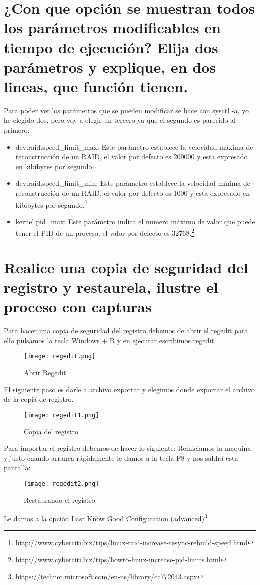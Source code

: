\section{¿Con que opción se muestran todos los parámetros modificables en tiempo de ejecución? Elija dos parámetros y explique, en dos lineas, que función tienen.}
Para poder ver los parámetros que se pueden modificar se hace con sysctl -a, yo he elegido dos, pero voy a elegir un tercero ya que el segundo es parecido al primero.
\begin{itemize}
\item dev.raid.speed\_limit\_max: Este parámetro establece la velocidad máxima de reconstrucción de un RAID, el valor por defecto es 200000 y esta expresado en kibibytes por segundo.
\item dev.raid.speed\_limit\_min: Este parámetro establece la velocidad mínima de reconstrucción de un RAID, el valor por defecto es 1000 y esta expresado en kibibytes por segundo.\footnote{\url{http://www.cyberciti.biz/tips/linux-raid-increase-resync-rebuild-speed.html}}
\item kernel.pid\_max: Este parámetro indica el numero máximo de valor que puede tener el PID de un proceso, el valor por defecto es 32768.\footnote{\url{http://www.cyberciti.biz/tips/howto-linux-increase-pid-limits.html}}
\end{itemize}
\section{Realice una copia de seguridad del registro y restaurela, ilustre el proceso con capturas}
Para hacer una copia de seguridad del registro debemos de abrir el regedit para ello pulsamos la tecla Windows + R y en ejecutar escribimos regedit.
\begin{figure}[H] 
\centering
\texttt{[image: regedit.png]}  
\label{figura2:}
\caption{Abrir Regedit}
\end{figure}
El siguiente paso es darle a archivo exportar y elegimos donde exportar el archivo de la copia de registro.
\begin{figure}[H] 
\centering
\texttt{[image: regedit1.png]}  
\label{figura3:}
\caption{Copia del registro}
\end{figure}
Para importar el registro debemos de hacer lo siguiente:
Reiniciamos la maquina y justo cuando arranca rápidamente le damos a la tecla F8 y nos saldrá esta pantalla:
\begin{figure}[H] 
\centering
\texttt{[image: regedit2.png]}  
\label{figura4:}
\caption{Restaurando el registro}
\end{figure}
Le damos a la opción Last Know Good Configuration (advanced)\footnote{\url{https://technet.microsoft.com/en-us/library/cc772043.aspx}}
